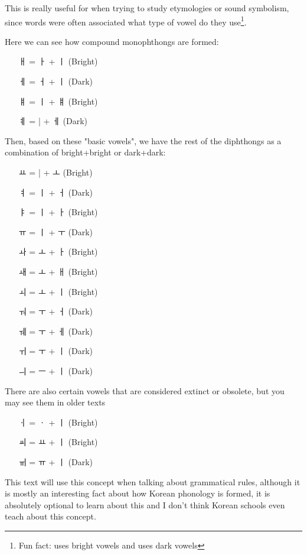 This is really useful for when trying to study etymologies or sound symbolism, since words were often associated what type of vowel do they use\footnote{Fun fact:  uses bright vowels and  uses dark vowels}.

Here we can see how compound monophthongs are formed:

\begin{multicols}{3}
    \begin{enumerate}
        \item [ㅐ] = ㅏ + ㅣ (Bright)
        \item [ㅔ] = ㅓ + ㅣ (Dark)
        \item [ㅒ] = ㅣ + ㅒ (Bright)
        \item [ㅖ] = | + ㅔ (Dark)
    \end{enumerate}
\end{multicols}

Then, based on these "basic vowels", we have the rest of the diphthongs as a combination of bright+bright or dark+dark:
\begin{multicols}{3}{
    \begin{enumerate}
    \item [ㅛ] = | + ㅗ (Bright)
    \item [ㅕ] = ㅣ + ㅓ (Dark)
    \item [ㅑ] = ㅣ + ㅏ (Bright)
    \item [ㅠ] = ㅣ + ㅜ (Dark)
    \item [ㅘ] = ㅗ + ㅏ (Bright)
    \item [ㅙ] = ㅗ + ㅐ (Bright)
    \item [ㅚ] = ㅗ + ㅣ (Bright)
    \item [ㅝ] = ㅜ + ㅓ (Dark)
    \item [ㅞ] = ㅜ + ㅔ (Dark)
    \item [ㅟ] = ㅜ + ㅣ (Dark)
    \item [ㅢ] = ㅡ + ㅣ (Dark)
    \end{enumerate}}
\end{multicols}

There are also certain vowels that are considered extinct or obsolete, but you may see them in older texts

\begin{multicols}{3}
    \begin{enumerate}
        \item [ㆎ] = ㆍ + ㅣ (Bright)
        \item [ㆉ] = ㅛ + ㅣ (Bright)
        \item [ㆌ] = ㅠ + ㅣ (Dark)
    \end{enumerate}
\end{multicols}

This text will use this concept when talking about grammatical rules, although it is mostly an interesting fact about how Korean phonology is formed, it is absolutely optional to learn about this and I don't think Korean schools even teach about this concept.